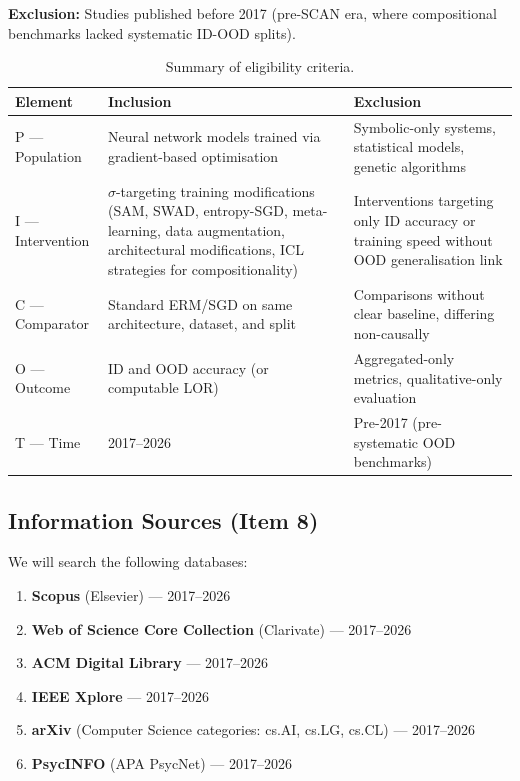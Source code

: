 \textbf{Exclusion:} Studies published before 2017 (pre-SCAN era, where compositional benchmarks lacked systematic ID-OOD splits).

\begin{table}[htbp]
\centering
\caption{Summary of eligibility criteria.}\label{tab:eligibility}
\begin{tabular}{p{1.5cm} p{4.5cm} p{4.5cm}}
\toprule
\textbf{Element} & \textbf{Inclusion} & \textbf{Exclusion} \\
\midrule
P --- Population &
Neural network models trained via gradient-based optimisation &
Symbolic-only systems, statistical models, genetic algorithms \\
\midrule
I --- Intervention &
$\sigma$-targeting training modifications (SAM, SWAD, entropy-SGD, meta-learning, data augmentation, architectural modifications, ICL strategies for compositionality) &
Interventions targeting only ID accuracy or training speed without OOD generalisation link \\
\midrule
C --- Comparator &
Standard ERM/SGD on same architecture, dataset, and split &
Comparisons without clear baseline, differing non-causally \\
\midrule
O --- Outcome &
ID and OOD accuracy (or computable LOR) &
Aggregated-only metrics, qualitative-only evaluation \\
\midrule
T --- Time &
2017--2026 &
Pre-2017 (pre-systematic OOD benchmarks) \\
\bottomrule
\end{tabular}
\end{table}

\subsection{Information Sources (Item 8)}

We will search the following databases:

\begin{enumerate}[nosep]
\item \textbf{Scopus} (Elsevier) --- 2017--2026
\item \textbf{Web of Science Core Collection} (Clarivate) --- 2017--2026
\item \textbf{ACM Digital Library} --- 2017--2026
\item \textbf{IEEE Xplore} --- 2017--2026
\item \textbf{arXiv} (Computer Science categories: cs.AI, cs.LG, cs.CL) --- 2017--2026
\item \textbf{PsycINFO} (APA PsycNet) --- 2017--2026
\end{enumerate}

